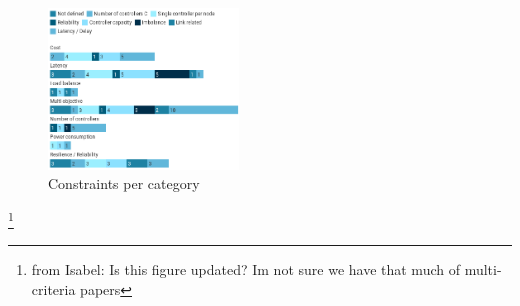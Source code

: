 \documentclass{IEEEtran}
\newcommand\fia[1]{{\color{red}\footnote{\color{red}from Isabel: #1}}} %
\begin{document}
\begin{figure}
    \centering
    \includegraphics[width=0.45\textwidth]{Pictures/constraints.png}
    \caption{Constraints per category}
    \label{fig:constraints}
\end{figure}
\fia{Is this figure updated? Im not sure we have that much of multi-criteria papers}

\end{document}
